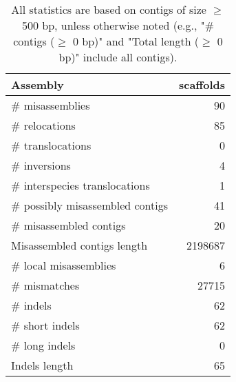 \documentclass[12pt,a4paper]{article}
\begin{document}
\begin{table}[ht]
\begin{center}
\caption{All statistics are based on contigs of size $\geq$ 500 bp, unless otherwise noted (e.g., "\# contigs ($\geq$ 0 bp)" and "Total length ($\geq$ 0 bp)" include all contigs).}
\begin{tabular}{|l*{1}{|r}|}
\hline
Assembly & scaffolds \\ \hline
\# misassemblies & 90 \\ \hline
\hspace{5mm}\# relocations & 85 \\ \hline
\hspace{5mm}\# translocations & 0 \\ \hline
\hspace{5mm}\# inversions & 4 \\ \hline
\hspace{5mm}\# interspecies translocations & 1 \\ \hline
\# possibly misassembled contigs & 41 \\ \hline
\# misassembled contigs & 20 \\ \hline
Misassembled contigs length & 2198687 \\ \hline
\# local misassemblies & 6 \\ \hline
\# mismatches & 27715 \\ \hline
\# indels & 62 \\ \hline
\hspace{5mm}\# short indels & 62 \\ \hline
\hspace{5mm}\# long indels & 0 \\ \hline
Indels length & 65 \\ \hline
\end{tabular}
\end{center}
\end{table}
\end{document}
